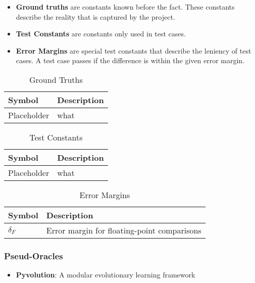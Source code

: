 \documentclass[12pt, titlepage]{article}
\begin{document}
\begin{itemize}
  \item \textbf{Ground truths} are constants known before the fact. These constants describe the reality that is captured by the project.
  \item \textbf{Test Constants} are constants only used in test cases.
  \item \textbf{Error Margins} are special test constants that describe the leniency of test cases. A test case passes if the difference is within the given error margin.
\end{itemize}


\begin{table}[!h]
  \caption{Ground Truths}
  \label{table:ground-truths}
  \begin{tabularx}{\textwidth}{p{3cm}X}
    \toprule {\bf Symbol} & {\bf Description}\\
    \midrule
    Placeholder & what \\
    \bottomrule
  \end{tabularx}
\end{table}

\begin{table}[!h]
  \caption{Test Constants}
  \label{table:test-constants}
  \begin{tabularx}{\textwidth}{p{3cm}X}
    \toprule {\bf Symbol} & {\bf Description}\\
    \midrule
    Placeholder & what \\
    \bottomrule
  \end{tabularx}
\end{table}

\begin{table}[!h]
  \caption{Error Margins}
  \label{table:error-margins}
  \begin{tabularx}{\textwidth}{p{3cm}X}
    \toprule {\bf Symbol} & {\bf Description}\\
    \midrule
    $\delta_{F}$ & Error margin for floating-point comparisons \\
    \bottomrule
  \end{tabularx}
\end{table}

\subsubsection{Pseud-Oracles}
\begin{itemize}
  \item \textbf{Pyvolution}: A modular evolutionary learning framework
\end{itemize}
\end{document}
